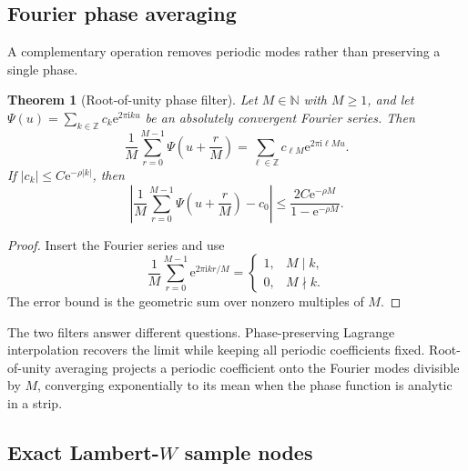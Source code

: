 \documentclass[11pt,oneside]{article}
\newtheorem{theorem}{Theorem}[section]
\theoremstyle{definition}
\theoremstyle{remark}
\newcommand{\N}{\mathbb N}
\newcommand{\Z}{\mathbb Z}
\newcommand{\e}{\mathrm e}
\newcommand{\ii}{\mathrm i}
\begin{document}
\subsection{Fourier phase averaging}

A complementary operation removes periodic modes rather than preserving a single phase.

\begin{theorem}[Root-of-unity phase filter]
\label{thm:phase-average}
Let $M\in\N$ with $M\ge1$, and let
\(
 \Psi(u)=\sum_{k\in\Z}c_k\e^{2\pi\ii ku}
\)
be an absolutely convergent Fourier series.  Then
\begin{equation}
 \frac1M\sum_{r=0}^{M-1}\Psi\!\left(u+\frac rM\right)
 =\sum_{\ell\in\Z}c_{\ell M}\e^{2\pi\ii\ell Mu}.            \label{eq:phase-average}
\end{equation}
If $|c_k|\le C\e^{-\rho|k|}$, then
\begin{equation}
 \left|
 \frac1M\sum_{r=0}^{M-1}\Psi\!\left(u+\frac rM\right)-c_0
 \right|
 \le\frac{2C\e^{-\rho M}}{1-\e^{-\rho M}}.                 \label{eq:phase-average-error}
\end{equation}
\end{theorem}

\begin{proof}
Insert the Fourier series and use
\[
 \frac1M\sum_{r=0}^{M-1}\e^{2\pi\ii kr/M}
 =\begin{cases}1,&M\mid k,\\0,&M\nmid k.\end{cases}
\]
The error bound is the geometric sum over nonzero multiples of $M$.
\end{proof}

The two filters answer different questions.  Phase-preserving Lagrange interpolation recovers
the limit while keeping all periodic coefficients fixed.  Root-of-unity averaging projects a
periodic coefficient onto the Fourier modes divisible by $M$, converging exponentially to its
mean when the phase function is analytic in a strip.

\subsection{Exact Lambert-\texorpdfstring{$W$}{W} sample nodes}
\end{document}
